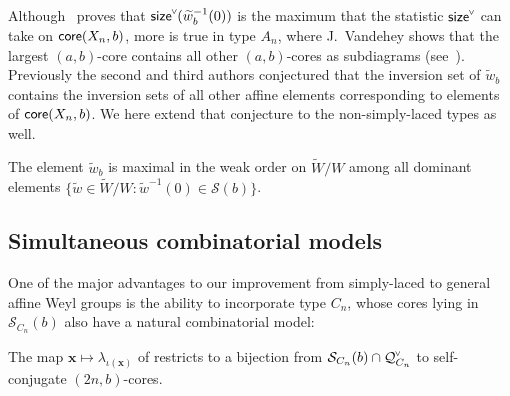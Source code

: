 \documentclass[ALCO,published]{cedram}
\newcommand{\chk}[1]{#1^{\normalfont\smash{\scalebox{.5}[.5]{\rotatebox{90}{\textbf{\textless}}}}}}
\newcommand{\wa}{\widetilde{W}}
\newcommand{\Q}{\mathcal{Q}}
\newcommand{\Sommers}{\mathcal{S}}
\newcommand{\core}{{\sf core}}
\newcommand{\waf}{\widetilde{w}}
\newcommand{\wf}{\waf_{\rat}}
\newcommand{\size}{{\sf size}}
\newcommand{\rat}{b}
\begin{document}
Although~ proves that $\chk\size(\wf^{-1}(0))$ is the maximum that the statistic $\chk\size$ can take on $\core(X_n,b)$, more is true in type $A_n$, where J.~Vandehey shows that the largest $(a,b)$-core contains all other $(a,b)$-cores as subdiagrams (see~\cite{vandehey2008general,fayers2011t}). Previously the second and third authors conjectured \cite[Conjecture 6.14]{thiel2017strange} that the inversion set of $\wf$ contains the inversion sets of all other affine elements corresponding to elements of $\core(X_n,b)$. We here extend that conjecture to the non-simply-laced types as well.

\begin{conjecture}
The element $\wf$ is maximal in the weak order on $\wa/W$ among all dominant elements $\{ \waf \in \wa/W : \waf^{-1}(0) \in \Sommers(b)\}$.
\label{conj:w_b_is_maximal_in_weak}
\end{conjecture}


\subsection{Simultaneous combinatorial models}

One of the major advantages to our improvement from simply-laced to general affine Weyl groups is the ability to incorporate type $C_n$, whose cores lying in $\Sommers_{C_n}(b)$ also have a natural combinatorial model:

\begin{theorem}
The map $\mathbf{x}\mapsto \lambda_{\iota(\mathbf{x})}$ of  restricts to a bijection from $\Sommers_{C_n}(b)\cap\chk{\Q}_{C_n}$ to self-conjugate $(2n,b)$-cores.
\end{theorem}
\end{document}
